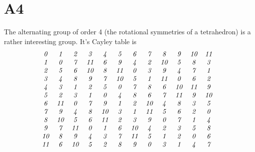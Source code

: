\documentclass[12pt]{article}
\begin{document}
\section{A4}

 The alternating group of order 4 (the rotational symmetries of a
tetrahedron) is a rather interesting group.  It's Cayley table is
\begin{displaymath}
\begin{array}{cccccccccccc}
 \G0 &\G1 &\G2 &\G3 &\G4 &\G5 &\G6 &\G7 &\G8 &\G9 &\G1\G0 &\G1\G1 \\
 \G1 &\G0 &\G7 &\G1\G1 &\G6 &\G9 &\G4 &\G2 &\G1\G0 &\G5 &\G8 &\G3 \\
 \G2 &\G5 &\G6 &\G1\G0 &\G8 &\G1\G1 &\G0 &\G3 &\G9 &\G4 &\G7 &\G1 \\
 \G3 &\G4 &\G8 &\G9 &\G7 &\G1\G0 &\G5 &\G1 &\G1\G1 &\G0 &\G6 &\G2 \\
 \G4 &\G3 &\G1 &\G2 &\G5 &\G0 &\G7 &\G8 &\G6 &\G1\G0 &\G1\G1 &\G9 \\
 \G5 &\G2 &\G3 &\G1 &\G0 &\G4 &\G8 &\G6 &\G7 &\G1\G1 &\G9 &\G1\G0 \\
 \G6 &\G1\G1 &\G0 &\G7 &\G9 &\G1 &\G2 &\G1\G0 &\G4 &\G8 &\G3 &\G5 \\
 \G7 &\G9 &\G4 &\G8 &\G1\G0 &\G3 &\G1 &\G1\G1 &\G5 &\G6 &\G2 &\G0 \\
 \G8 &\G1\G0 &\G5 &\G6 &\G1\G1 &\G2 &\G3 &\G9 &\G0 &\G7 &\G1 &\G4 \\
 \G9 &\G7 &\G1\G1 &\G0 &\G1 &\G6 &\G1\G0 &\G4 &\G2 &\G3 &\G5 &\G8 \\
 \G1\G0 &\G8 &\G9 &\G4 &\G3 &\G7 &\G1\G1 &\G5 &\G1 &\G2 &\G0 &\G6 \\
 \G1\G1 &\G6 &\G1\G0 &\G5 &\G2 &\G8 &\G9 &\G0 &\G3 &\G1 &\G4 &\G7
\end{array}
\end{displaymath}
\end{document}
